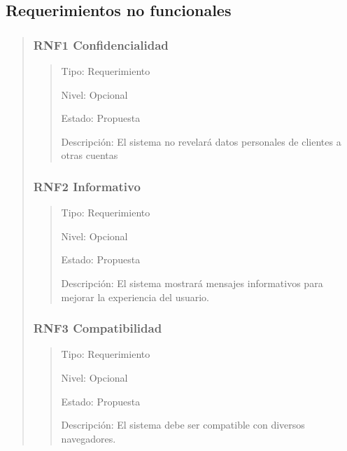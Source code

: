 \documentclass[14pt]{article}
\begin{document}
        \subsection{Requerimientos no funcionales}
            \begin{quote}
                \subsubsection{RNF1 Confidencialidad}\label{RNF1 Confidencialidad}
                    \begin{quote}
                        Tipo: Requerimiento
                        
                        Nivel: Opcional
                        
                        Estado: Propuesta
                        
                        Descripción: El sistema no revelará datos personales de clientes a otras cuentas
                    \end{quote}
                \subsubsection{RNF2 Informativo}\label{RNF2 Informativo}
                    \begin{quote}
                        Tipo: Requerimiento
                        
                        Nivel: Opcional
                        
                        Estado: Propuesta
                        
                        Descripción: El sistema mostrará mensajes informativos para mejorar la experiencia del usuario.
                    \end{quote}
                \subsubsection{RNF3 Compatibilidad}\label{RNF3 Compatibilidad}
                    \begin{quote}
                        Tipo: Requerimiento
    
                        Nivel: Opcional
    
                        Estado: Propuesta
    
                        Descripción: El sistema debe ser compatible con diversos navegadores.
                    \end{quote}

\end{quote}
\end{document}

